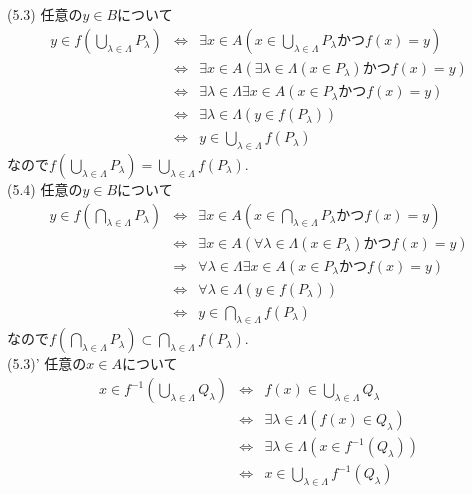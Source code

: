 \documentclass{jsarticle}
\begin{document}
\subsection{} %
\noindent
(5.3) 任意の$y \in B$について
\begin{eqnarray*}
	y \in f\left(\bigcup_{\lambda \in \Lambda}P_\lambda\right)
	&\Leftrightarrow& \exists{x \in A}(x \in \bigcup_{\lambda \in \Lambda}P_\lambda かつ f(x) = y)\\
	&\Leftrightarrow& \exists{x \in A}(\exists{\lambda \in \Lambda}(x \in P_\lambda) かつ f(x) = y)\\
	&\Leftrightarrow& \exists{\lambda \in \Lambda}\exists{x \in A}(x \in P_\lambda かつ f(x) = y)\\
	&\Leftrightarrow& \exists{\lambda \in \Lambda}(y \in f(P_\lambda))\\
	&\Leftrightarrow& y \in \bigcup_{\lambda \in \Lambda}f(P_\lambda)
\end{eqnarray*}
なので$f\left(\bigcup_{\lambda \in \Lambda}P_\lambda\right) = \bigcup_{\lambda \in \Lambda}f(P_\lambda)$.\\
(5.4) 任意の$y \in B$について
\begin{eqnarray*}
	y \in f\left(\bigcap_{\lambda \in \Lambda}P_\lambda\right)
	&\Leftrightarrow& \exists{x \in A}(x \in \bigcap_{\lambda \in \Lambda}P_\lambda かつ f(x) = y)\\
	&\Leftrightarrow& \exists{x \in A}(\forall{\lambda \in \Lambda}(x \in P_\lambda) かつ f(x) = y)\\
	&\Rightarrow& \forall{\lambda \in \Lambda}\exists{x \in A}(x \in P_\lambda かつ f(x) = y)\\
	&\Leftrightarrow& \forall{\lambda \in \Lambda}(y \in f(P_\lambda))\\
	&\Leftrightarrow& y \in \bigcap_{\lambda \in \Lambda}f(P_\lambda)
\end{eqnarray*}
なので$f\left(\bigcap_{\lambda \in \Lambda}P_\lambda\right) \subset \bigcap_{\lambda \in \Lambda}f(P_\lambda)$.\\
(5.3)' 任意の$x \in A$について
\begin{eqnarray*}
	x \in f^{-1}\left(\bigcup_{\lambda \in \Lambda}Q_\lambda\right)
	&\Leftrightarrow& f(x) \in \bigcup_{\lambda \in \Lambda}Q_\lambda\\
	&\Leftrightarrow& \exists{\lambda \in \Lambda}(f(x) \in Q_\lambda)\\
	&\Leftrightarrow& \exists{\lambda \in \Lambda}(x \in f^{-1}(Q_\lambda))\\
	&\Leftrightarrow& x \in \bigcup_{\lambda \in \Lambda}f^{-1}(Q_\lambda)
\end{eqnarray*}
\end{document}
